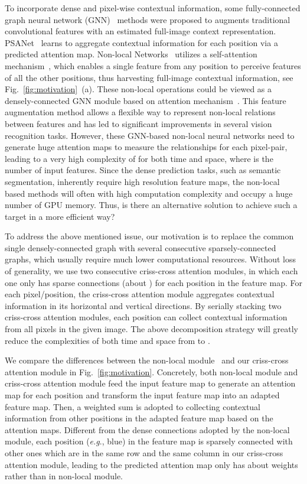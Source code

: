\documentclass[10pt,journal,compsoc]{IEEEtran}
\def\eg{\emph{e.g}.} \def\Eg{\emph{E.g}.}
\begin{document}
To incorporate dense and pixel-wise contextual information, some fully-connected graph neural network (GNN)~\cite{scarselli2008graph} methods were proposed to augments traditional convolutional features with an estimated full-image context representation. 
PSANet~\cite{zhao2018psanet} learns to aggregate contextual information for each position via a predicted attention map. Non-local Networks~\cite{wang2018non} utilizes a self-attention mechanism~\cite{cheng2016long, vaswani2017attention}, which enables a single feature from any position to perceive features of all the other positions, thus harvesting full-image contextual information, see Fig.~\ref{fig:motivation}~(a). These non-local operations could be viewed as a densely-connected GNN module based on attention mechanism~\cite{vaswani2017attention}. This feature augmentation method allows a flexible way to represent non-local relations between features and has led to significant improvements in several vision recognition tasks. However, these GNN-based non-local neural networks need to generate huge attention maps to measure the relationships for each pixel-pair, leading to a very high complexity of  for both time and space, where  is the number of input features. Since the dense prediction tasks, such as semantic segmentation, inherently require high resolution feature maps, the non-local based methods will often with high computation complexity and occupy a huge number of GPU memory. Thus, is there an alternative solution to achieve such a target in a more efficient way?




To address the above mentioned issue, our motivation is to replace the common single densely-connected graph with several consecutive sparsely-connected graphs, which usually require much lower computational resources. Without loss of generality, we use two consecutive criss-cross attention modules, in which each one only has sparse connections (about ) for each position in the feature map. For each pixel/position, the criss-cross attention module aggregates contextual information in its horizontal and vertical directions. By serially stacking two criss-cross attention modules, each position can collect contextual information from all pixels in the given image. The above decomposition strategy will greatly reduce the complexities of both time and space from  to .

We compare the differences between the non-local module~\cite{wang2018non} and our criss-cross attention module in Fig.~\ref{fig:motivation}. Concretely, both non-local module and criss-cross attention module feed the input feature map to generate an attention map for each position and transform the input feature map into an adapted feature map. Then, a weighted sum is adopted to collecting contextual information from other positions in the adapted feature map based on the attention maps. Different from the dense connections adopted by the non-local module, each position (\eg, blue) in the feature map is sparsely connected with other ones which are in the same row and the same column in our criss-cross attention module, leading to the predicted attention map only has about  weights rather than  in non-local module.
\end{document}
